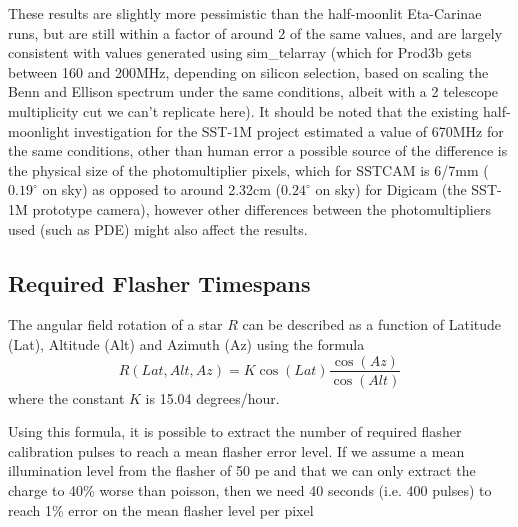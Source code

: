 These results are slightly more pessimistic than the half-moonlit Eta-Carinae runs, but are still within a factor of around 2 of the same values, and are largely consistent with values generated using sim\_telarray (which for Prod3b gets between 160 and 200MHz,    depending on silicon selection, based on scaling the Benn and Ellison spectrum under the same conditions, albeit with a 2 telescope multiplicity cut we can't replicate here). It should be noted that the existing half-moonlight investigation for the SST-1M project \cite{1mcalib} estimated a value of 670MHz for the same conditions, other than human error a possible source of the difference is the physical size of the photomultiplier pixels, which for SSTCAM is 6/7mm ($0.19^{\circ}$ on sky) as opposed to around 2.32cm ($0.24^{\circ}$ on sky) for Digicam (the SST-1M prototype camera), however other differences between the photomultipliers used (such as PDE) might also affect the results. 

\subsection{Required Flasher Timespans}

The angular field rotation of a star $R$ can be described as a function of Latitude (Lat), Altitude (Alt) and Azimuth (Az) using the formula
\begin{equation}
    R(Lat,Alt,Az)=K\cos(Lat)\frac{\cos(Az)}{\cos(Alt)}
    \label{eq:rot}
\end{equation}
where the constant $K$ is 15.04 degrees/hour.

Using this formula, it is possible to extract the number of required flasher calibration pulses to reach a mean flasher error level. If we assume a mean illumination level from the flasher of 50 pe and that we can only extract the charge to 40\% worse than poisson, then we need 40 seconds (i.e. 400 pulses) to reach 1\% error on the mean flasher level per pixel

